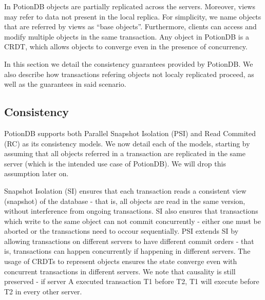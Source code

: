 \documentclass{vldb}
\begin{document}
In PotionDB objects are partially replicated across the servers.
Moreover, views may refer to data not present in the local replica.
For simplicity, we name objects that are referred by views as ``base objects''.
Furthermore, clients can access and modify multiple objects in the same transaction.
Any object in PotionDB is a CRDT, which allows objects to converge even in the presence of concurrency.

In this section we detail the consistency guarantees provided by PotionDB.
We also describe how transactions refering objects not localy replicated proceed, as well as the guarantees in said scenario.


\subsection{Consistency}

PotionDB supports both Parallel Snapshot Isolation (PSI) \cite{sovran2011transactional} and Read Commited (RC) as its consistency models.
We now detail each of the models, starting by assuming that all objects referred in a transaction are replicated in the same server (which is the intended use case of PotionDB).
We will drop this assumption later on.

Snapshot Isolation (SI) ensures that each transaction reads a consistent view (snapshot) of the database - that is, all objects are read in the same version, without interference from ongoing transactions.
SI also ensures that transactions which write to the same object can not commit concurrently - either one must be aborted or the transactions need to occour sequentially.
PSI extends SI by allowing transactions on different servers to have different commit orders - that is, transactions can happen concurrently if happening in different servers. 
The usage of CRDTs to represent objects ensures the state converge even with concurrent transactions in different servers.
We note that causality is still preserved - if server A executed transaction T1 before T2, T1 will execute before T2 in every other server.

\end{document}
